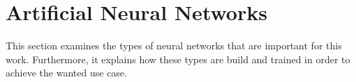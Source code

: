 \section{Artificial Neural Networks}
\label{sec:neural-networks}
This section examines the types of neural networks that are important for this work.
Furthermore, it explains how these types are build and trained in order to achieve the wanted use case.





